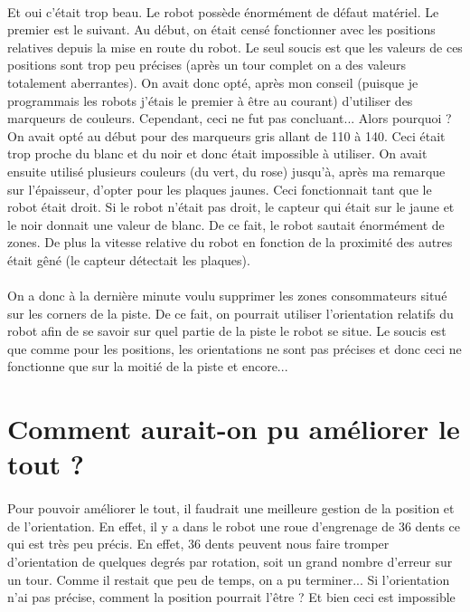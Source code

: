 \documentclass[12pt,oneside,a4paper]{book}
\begin{document}
	\paragraph{}Et oui c'était trop beau. Le robot possède énormément de défaut matériel. Le premier est le suivant. Au début, on était censé fonctionner avec les positions relatives depuis la mise en route du robot. Le seul soucis est que les valeurs de ces positions sont trop peu précises (après un tour complet on a des valeurs totalement aberrantes). On avait donc opté, après mon conseil (puisque je programmais les robots j'étais le premier à être au courant) d'utiliser des marqueurs de couleurs. Cependant, ceci ne fut pas concluant... Alors pourquoi ? On avait opté au début pour des marqueurs gris allant de 110 à 140. Ceci était trop proche du blanc et du noir et donc était impossible à utiliser. On avait ensuite utilisé plusieurs couleurs (du vert, du rose) jusqu'à, après ma remarque sur l'épaisseur, d'opter pour les plaques jaunes. Ceci fonctionnait tant que le robot était droit. Si le robot n'était pas droit, le capteur qui était sur le jaune et le noir donnait une valeur de blanc. De ce fait, le robot sautait énormément de zones. De plus la vitesse relative du robot en fonction de la proximité des autres était gêné (le capteur détectait les plaques).
	\paragraph{} On a donc à la dernière minute voulu supprimer les zones consommateurs situé sur les corners de la piste. De ce fait, on pourrait utiliser l'orientation relatifs du robot afin de se savoir sur quel partie de la piste le robot se situe. Le soucis est que comme pour les positions, les orientations ne sont pas précises et donc ceci ne fonctionne que sur la moitié de la piste et encore...

\section{Comment aurait-on pu améliorer le tout ?} 
	\paragraph{} Pour pouvoir améliorer le tout, il faudrait une meilleure gestion de la position et de l'orientation. En effet, il y a dans le robot une roue d'engrenage de 36 dents ce qui est très peu précis. En effet, 36 dents peuvent nous faire tromper d'orientation de quelques degrés par rotation, soit un grand nombre d'erreur sur un tour. Comme il restait que peu de temps, on a pu terminer... 
Si l'orientation n'ai pas précise, comment la position pourrait l'être ? Et bien ceci est impossible
\end{document}
